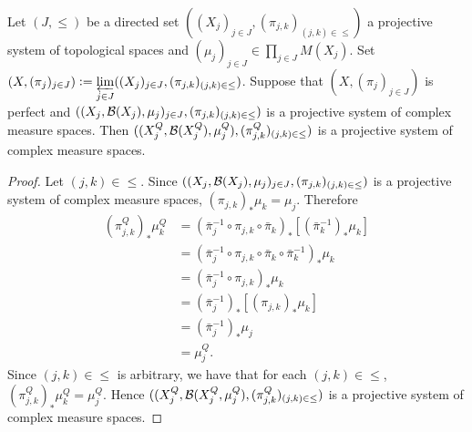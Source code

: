\documentclass{book}
\begin{document}
\begin{ex} 
	Let $(J, {\leq})$ be a directed set $((X_j)_{j \in J}, (\pi_{j,k})_{(j,k) \in {\leq}})$ a projective system of topological spaces and $(\mu_j)_{j \in J} \in \prod\limits_{j \in J} M(X_j)$. Set $(X, (\pi_j)_{j \in J}) \vcentcolon= \varprojlim\limits_{j \in J} ((X_j)_{j \in J}, (\pi_{j,k})_{(j,k) \in {\leq}})$. Suppose that $(X, (\pi_j)_{j \in J})$ is perfect and $((X_j, \mathcal{B}(X_j), \mu_j)_{j \in J}, (\pi_{j,k})_{(j,k) \in {\leq}})$ is a projective system of complex measure spaces. Then $((X^Q_j, \mathcal{B}(X^Q_j), \mu^Q_j), (\pi^Q_{j,k})_{(j,k) \in {\leq}})$ is a  projective system of complex measure spaces.
\end{ex}

\begin{proof}
	Let $(j,k) \in {\leq}$. Since $((X_j, \mathcal{B}(X_j), \mu_j)_{j \in J}, (\pi_{j,k})_{(j,k) \in {\leq}})$ is a projective system of complex measure spaces, $(\pi_{j,k})_* \mu_k = \mu_j$. Therefore
	\begin{align*}
		(\pi^Q_{j,k})_*\mu^Q_k
		& = (\bar{\pi}_j^{-1} \circ \pi_{j,k} \circ \bar{\pi}_k)_*[(\bar{\pi}_k^{-1})_*\mu_k] \\
		& = (\bar{\pi}_j^{-1} \circ \pi_{j,k} \circ \bar{\pi}_k \circ \bar{\pi}_k^{-1})_*\mu_k \\
		& = (\bar{\pi}_j^{-1} \circ \pi_{j,k})_* \mu_k \\
		& = (\bar{\pi}_j^{-1})_*[(\pi_{j,k})_* \mu_k] \\
		& = (\bar{\pi}_j^{-1})_* \mu_j \\
		& = \mu^Q_j.
	\end{align*}
	Since $(j,k) \in {\leq}$ is arbitrary, we have that for each $(j,k) \in {\leq}$, $(\pi^Q_{j,k})_*\mu^Q_k = \mu^Q_j$. Hence $((X^Q_j, \mathcal{B}(X^Q_j, \mu^Q_j), (\pi^Q_{j,k})_{(j,k) \in {\leq}})$ is a  projective system of complex measure spaces.
\end{proof}
\end{document}
